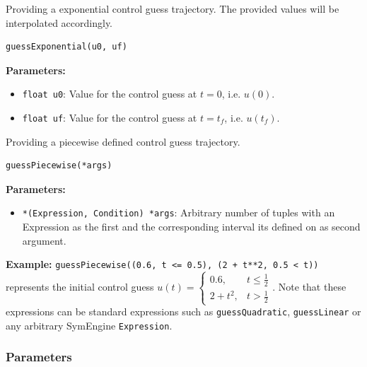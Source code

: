\documentclass[12pt]{article}
\begin{document}
\begin{mdframed}[backgroundcolor=gray!10, roundcorner=10pt, linewidth=1pt]
	
	Providing a exponential control guess trajectory. The provided values will be interpolated accordingly.
	
	\begin{lstlisting}
guessExponential(u0, uf)
	\end{lstlisting}
	
	\textbf{Parameters:}
	\begin{itemize}
		\item \texttt{float u0}: Value for the control guess at $t=0$, i.e. $u(0)$.
		\item \texttt{float uf}: Value for the control guess at $t=t_f$, i.e. $u(t_f)$.
	\end{itemize}
	
\end{mdframed}

\begin{mdframed}[backgroundcolor=gray!10, roundcorner=10pt, linewidth=1pt]
	
	Providing a piecewise defined control guess trajectory.
	
	\begin{lstlisting}
guessPiecewise(*args)
	\end{lstlisting}
	
	\textbf{Parameters:}
	\begin{itemize}
		\item \texttt{*(Expression, Condition) *args}: Arbitrary number of tuples with an Expression as the first and the corresponding interval its defined on as second argument.
	\end{itemize}

	\textbf{Example:} \texttt{guessPiecewise((0.6, t <= 0.5), (2 + t**2, 0.5 < t))} represents the initial control guess $u(t) = 
	\begin{cases}
		0.6,& t \leq \frac{1}{2} \\
		2 + t^2,& t > \frac{1}{2}
	\end{cases}$. Note that these expressions can be standard expressions such as \texttt{guessQuadratic}, \texttt{guessLinear} or any arbitrary SymEngine \texttt{Expression}.
\end{mdframed}

	\subsubsection{Parameters}
	
\end{document}
